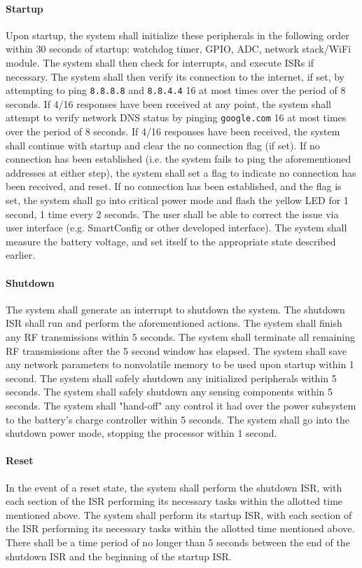 \paragraph{Startup} Upon startup, the system shall initialize these peripherals in the following order within 30 seconds of startup: watchdog timer, GPIO, ADC, network stack/WiFi module. The system shall then check for interrupts, and execute ISRs if necessary. The system shall then verify its connection to the internet, if set, by attempting to ping \texttt{8.8.8.8} and \texttt{8.8.4.4} 16 at most times over the period of 8 seconds. If 4/16 responses have been received at any point, the system shall attempt to verify network DNS status by pinging \texttt{google.com} 16 at most times over the period of 8 seconds. If 4/16 responses have been received, the system shall continue with startup and clear the no connection flag (if set). If no connection has been established (i.e. the system fails to ping the aforementioned addresses at either step), the system shall set a flag to indicate no connection has been received, and reset. If no connection has been established, and the flag is set, the system shall go into critical power mode and flash the yellow LED for 1 second, 1 time every 2 seconds. The user shall be able to correct the issue via user interface (e.g. SmartConfig or other developed interface). The system shall measure the battery voltage, and set itself to the appropriate state described earlier.

\paragraph{Shutdown} The system shall generate an interrupt to shutdown the system. The shutdown ISR shall run and perform the aforementioned actions. The system shall finish any RF transmissions within 5 seconds. The system shall terminate all remaining RF transmissions after the 5 second window has elapsed. The system shall save any network parameters to nonvolatile memory to be used upon startup within 1 second. The system shall safely shutdown any initialized peripherals within 5 seconds. The system shall safely shutdown any sensing components within 5 seconds. The system shall "hand-off" any control it had over the power subsystem to the battery's charge controller within 5 seconds. The system shall go into the shutdown power mode, stopping the processor within 1 second.

\paragraph{Reset} In the event of a reset state, the system shall perform the shutdown ISR, with each section of the ISR performing its necessary tasks within the allotted time mentioned above. The system shall perform its startup ISR, with each section of the ISR performing its necessary tasks within the allotted time mentioned above. There shall be a time period of no longer than 5 seconds between the end of the shutdown ISR and the beginning of the startup ISR.

